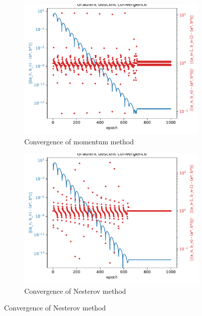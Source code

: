 \documentclass[12pt]{article}
\begin{document}
\begin{figure}[htbp]
    \centering
    \begin{subfigure}[t]{0.6\textwidth}
        \centering
        \includegraphics[width=\textwidth]{Homework1/ex2cm.pdf}
        \caption{Convergence of momentum method}
    \end{subfigure}\vspace{10pt}
    \begin{subfigure}[t]{0.6\textwidth}
        \centering
        \includegraphics[width=\textwidth]{Homework1/ex2cn.pdf}
        \caption{Convergence of Nesterov method}
    \end{subfigure}
\end{figure}
\inputminted[]{python}{./Homework1/ex2.py}
\end{document}
